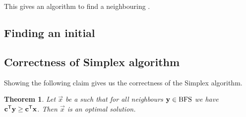 \documentclass[12pt,
    driverfallback=dvipdfm,
 	openany,
    a4paper,
    toc=bibliography,
    twoside,
    numbers=noenddot]{book}              %
\newtheorem{theorem}{Theorem}[chapter]
\begin{document}
This gives an algorithm to find a neighbouring \BFS.

\subsection{Finding an initial \BFS}

\subsection{Correctness of Simplex algorithm}
Showing the following claim gives us the correctness of the Simplex algorithm.
\begin{theorem}
Let $\vec x$ be a \BFS such that for all neighbours $\mathbf y \in \mathrm{BFS}$ we have ${\mathbf c}^{\mathsf{T}} \mathbf y \geq {\mathbf c}^{\mathsf{T}} \mathbf x$. Then $\vec x$ is an optimal solution.
\end{theorem}
\end{document}
